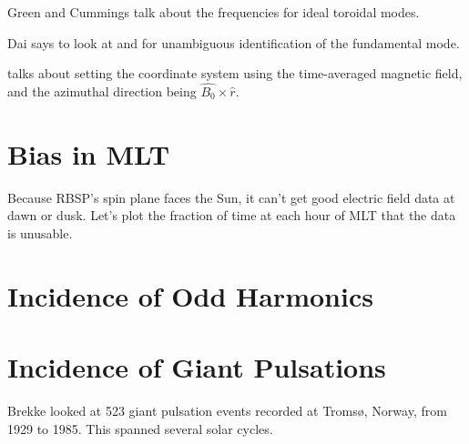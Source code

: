 Green\cite{green_1979} and Cummings\cite{cummings_1969} talk about the frequencies for ideal toroidal modes. 

Dai\cite{dai_2015} says to look at \cite{takahashi_2011} and \cite{dai_2013} for unambiguous identification of the fundamental mode. 

\cite{liu_2010} talks about setting the coordinate system using the time-averaged magnetic field, and the azimuthal direction being $\hat{B_0} \times \hat{r}$. 

\section{Bias in MLT}

Because RBSP's spin plane faces the Sun, it can't get good electric field data at dawn or dusk. Let's plot the fraction of time at each hour of MLT that the data is unusable. 

\section{Incidence of Odd Harmonics}



\section{Incidence of Giant Pulsations}





Brekke\cite{brekke_1987} looked at 523 giant pulsation events recorded at Troms{\o}, Norway, from 1929 to 1985. This spanned several solar cycles. 

